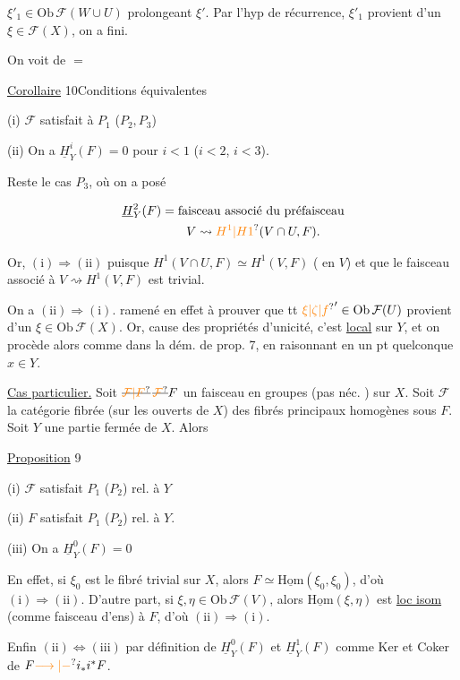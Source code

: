 $\xi'_1\in\mathrm{Ob}\,\mathcal F(W\cup U)$ prolongeant $\xi'$. Par l'hyp de récurrence, $\xi'_1$ provient d'un $\xi\in\mathcal F(X)$, on a fini.


On voit de $=$

\uline{Corollaire} 10\quad Conditions équivalentes

(i) $\mathcal F$ satisfait à $P_1$ ($P_2,P_3$)

(ii) On a $\underline H^i_Y(F)=0$ pour $i<1$ ($i<2$, $i<3$).

Reste le cas $P_3$, où on a posé

\[
\begin{aligned}
\underline H^2_Y(F)&=\text{faisceau associé du préfaisceau}\\
&\qquad V\rightsquigarrow \unsure{H^1|H1}(V\cap U,F).
\end{aligned}
\]

Or, $(\mathrm{i})\Rightarrow(\mathrm{ii})$ puisque $H^1(V\cap U,F)\simeq H^1(V,F)$ ( en $V$) et que le faisceau associé à $V\rightsquigarrow H^1(V,F)$ est trivial.

On a $(\mathrm{ii})\Rightarrow(\mathrm{i})$.  ramené en effet à prouver que tt $\unsure{\xi|\zeta|f}'\in\mathrm{Ob}\,\mathcal F(U)$ provient d'un $\xi\in\mathrm{Ob}\,\mathcal F(X)$. Or,  cause des propriétés d'unicité, c'est \uline{local} sur $Y$, et on procède alors comme dans la dém. de prop. 7, en  raisonnant en un pt quelconque $x\in Y$.


\uline{Cas particulier.} Soit $\deleted{\unsure{\mathcal F|F}}\,\deleted{\unsure{\mathcal F}}F$ un faisceau en groupes (pas néc. ) sur $X$. Soit $\mathcal F$ la catégorie fibrée (sur les ouverts de $X$) des fibrés principaux homogènes sous $F$. Soit $Y$ une partie fermée de $X$. Alors


\uline{Proposition} 9\quad {} 

(i) $\mathcal F$ satisfait $P_1$ ($P_2$) rel. à $Y$

(ii) $F$ satisfait $P_1$ ($P_2$) rel. à $Y$.

(iii) On a $\underline H^0_Y(F)=0$  

En effet,  si $\xi_0$ est le fibré trivial sur $X$, alors $F\simeq\underline{\mathrm{Hom}}(\xi_0,\xi_0)$, d'où $(\mathrm{i})\Rightarrow(\mathrm{ii})$. D'autre part, si $\xi,\eta\in\mathrm{Ob}\,\mathcal F(V)$, alors $\underline{\mathrm{Hom}}(\xi,\eta)$ est \uline{loc isom} (comme faisceau d'ens) à $F$, d'où $(\mathrm{ii})\Rightarrow(\mathrm{i})$.

Enfin $(\mathrm{ii})\Leftrightarrow(\mathrm{iii})$ par définition de $\underline H^0_Y(F)$ et $\underline H^1_Y(F)$ comme Ker et Coker de $F\unsure{\longrightarrow|-}i_*i^*F$.

